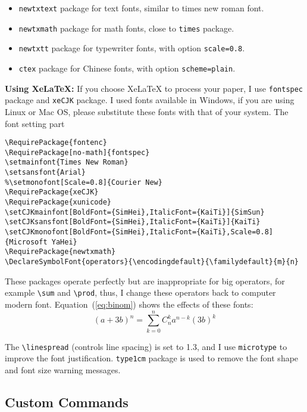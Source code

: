 \documentclass[en]{elegantpaper}
\begin{document}
\begin{itemize}
	\item \lstinline{newtxtext} package for text fonts, similar to times new roman font.
	\item \lstinline{newtxmath} package for math fonts, close to \lstinline{times} package.
	\item \lstinline{newtxtt} package for typewriter fonts, with option \lstinline{scale=0.8}.
	\item \lstinline{ctex} package for Chinese fonts, with option \lstinline{scheme=plain}.
\end{itemize}

\noindent\textbf{Using XeLaTeX:} If you choose XeLaTeX to process your paper, I use \lstinline{fontspec} package and \lstinline{xeCJK} package. I used fonts available in Windows, if you are using Linux or Mac OS, please substitute these fonts with that of your system. The font setting part

\begin{lstlisting}
\RequirePackage{fontenc}
\RequirePackage[no-math]{fontspec}
\setmainfont{Times New Roman}
\setsansfont{Arial}
%\setmonofont[Scale=0.8]{Courier New}
\RequirePackage{xeCJK}
\RequirePackage{xunicode}
\setCJKmainfont[BoldFont={SimHei},ItalicFont={KaiTi}]{SimSun}
\setCJKsansfont[BoldFont={SimHei},ItalicFont={KaiTi}]{KaiTi}
\setCJKmonofont[BoldFont={SimHei},ItalicFont={KaiTi},Scale=0.8]{Microsoft YaHei}
\RequirePackage{newtxmath}
\DeclareSymbolFont{operators}{\encodingdefault}{\familydefault}{m}{n}
\end{lstlisting}


These packages operate perfectly but are inappropriate for big operators, for example \lstinline{\sum} and \lstinline{\prod}, thus, I change these operators back to computer modern font. Equation~(\eqref{eq:binom}) shows the effects of these fonts:
\begin{equation}
(a+3b)^{n} = \sum_{k=0}^{n} C_{n}^{k} a^{n-k} (3b)^k \label{eq:binom}
\end{equation}



The \lstinline{\linespread} (controls line spacing) is set to 1.3, and I use \lstinline{microtype} to improve the font justification. \lstinline{type1cm} package is used to remove the font shape and font size warning messages.

\subsection{Custom Commands}
\end{document}
